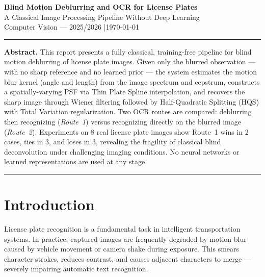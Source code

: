 \documentclass[12pt,a4paper]{article}
\begin{document}

\begin{center}
  {\LARGE\bfseries\color{myblue} Blind Motion Deblurring and OCR for License Plates}\\[0.4em]
  {\large A Classical Image Processing Pipeline Without Deep Learning}\\[0.3em]
  {\small Computer Vision --- 2025/2026 \quad|\quad \today}
\end{center}

\noindent\rule{\linewidth}{0.5pt}

\noindent\textbf{Abstract.}
This report presents a fully classical, training-free pipeline for blind motion deblurring
of license plate images. Given only the blurred observation --- with no sharp reference and
no learned prior --- the system estimates the motion blur kernel (angle and length) from the
image spectrum and cepstrum, constructs a spatially-varying PSF via Thin Plate Spline
interpolation, and recovers the sharp image through Wiener filtering followed by
Half-Quadratic Splitting (HQS) with Total Variation regularization.
Two OCR routes are compared: deblurring then recognizing (\emph{Route~1}) versus recognizing
directly on the blurred image (\emph{Route~2}).
Experiments on 8 real license plate images show Route~1 wins in 2 cases, ties in 3, and
loses in 3, revealing the fragility of classical blind deconvolution under challenging
imaging conditions. No neural networks or learned representations are used at any stage.

\noindent\rule{\linewidth}{0.5pt}

\tableofcontents
\vspace{0.5em}

\section{Introduction}

License plate recognition is a fundamental task in intelligent transportation systems.
In practice, captured images are frequently degraded by motion blur caused by vehicle
movement or camera shake during exposure. This smears character strokes, reduces contrast,
and causes adjacent characters to merge --- severely impairing automatic text recognition.
\end{document}
